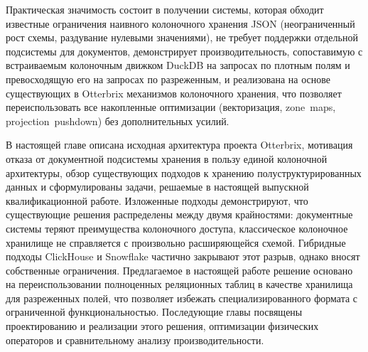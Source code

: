 Практическая значимость состоит в получении системы, которая
обходит известные ограничения наивного колоночного хранения JSON
(неограниченный рост схемы, раздувание нулевыми значениями), не
требует поддержки отдельной подсистемы для документов,
демонстрирует производительность, сопоставимую с встраиваемым
колоночным движком DuckDB на запросах по плотным полям и
превосходящую его на запросах по разреженным, и реализована на
основе существующих в Otterbrix механизмов колоночного хранения,
что позволяет переиспользовать все накопленные оптимизации
(векторизация, zone~maps, projection~pushdown) без дополнительных
усилий.

\chapterconclusion

В настоящей главе описана исходная архитектура проекта Otterbrix,
мотивация отказа от документной подсистемы хранения в пользу
единой колоночной архитектуры, обзор существующих подходов к
хранению полуструктурированных данных и сформулированы задачи,
решаемые в настоящей выпускной квалификационной работе. Изложенные
подходы демонстрируют, что существующие решения распределены между
двумя крайностями: документные системы теряют преимущества
колоночного доступа, классическое колоночное хранилище не
справляется с произвольно расширяющейся схемой. Гибридные подходы
ClickHouse и Snowflake частично закрывают этот разрыв, однако
вносят собственные ограничения. Предлагаемое в настоящей работе
решение основано на переиспользовании полноценных реляционных
таблиц в качестве хранилища для разреженных полей, что позволяет
избежать специализированного формата с ограниченной
функциональностью. Последующие главы посвящены проектированию и
реализации этого решения, оптимизации физических операторов и
сравнительному анализу производительности.
